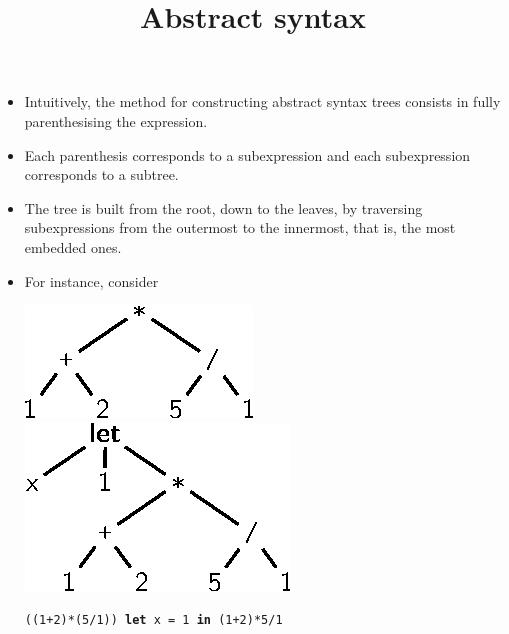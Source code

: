 \documentclass[wide]{slides}
\begin{document}
\begin{slide}
  \title{Abstract syntax}

  \begin{itemize}

    \item Intuitively, the method for constructing abstract syntax
      trees consists in fully parenthesising the expression.

    \item Each parenthesis corresponds to a subexpression and each
      subexpression corresponds to a subtree.

    \item The tree is built from the root, down to the leaves, by
      traversing subexpressions from the outermost to the innermost,
      that is, the most embedded ones.

    \item For instance, consider
      \begin{center}
        \includegraphics{arith_tree1.eps}
        \qquad
        \includegraphics[bb=51 658 175 721]{arith_tree2.eps}
      \end{center}
  \centerline{\texttt{((1+2)*(5/1)) \quad\qquad \texttt{\textbf{let} x = 1 \textbf{in} (1+2)*5/1}}}

  \end{itemize}

\end{slide}
\end{document}
